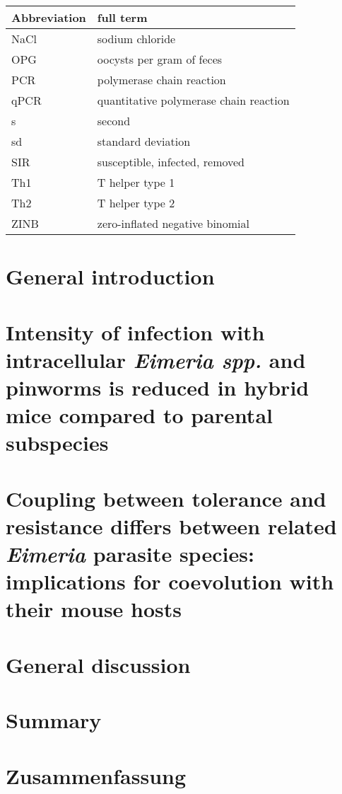 \documentclass[11pt]{report}
\numberwithin{equation}{section} %
\begin{document}
\begin{tabular}{l l}
Abbreviation & full term \\
\hline
NaCl & sodium chloride \\
OPG & oocysts per gram of feces \\
PCR & polymerase chain reaction \\
qPCR & quantitative polymerase chain reaction \\
s & second \\
sd & standard deviation \\
SIR & susceptible, infected, removed \\
Th1 & T helper type 1 \\
Th2 & T helper type 2 \\
ZINB &  zero-inflated negative binomial
\end{tabular}

\chapter{General introduction}

 
\chapter{Intensity of infection with intracellular \textit{Eimeria spp.} and pinworms is reduced in hybrid mice compared to parental subspecies}


\chapter{Coupling between tolerance and resistance differs between related \textit{Eimeria} parasite species: implications for coevolution with their mouse hosts}


\chapter{General discussion}


\chapter*{Summary}


\chapter*{Zusammenfassung}

\end{document}
